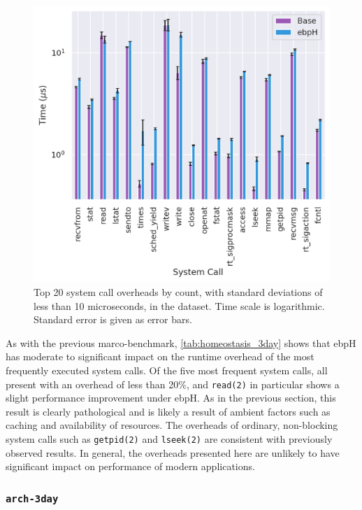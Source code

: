 \documentclass[
  12pt]{findlay}
\newcommand{\passthrough}[1]{#1}
\begin{document}
\begin{figure}
    \caption[Top 20 system call overheads by count in the  dataset]{
        Top 20 system call overheads by count, with standard deviations of less than 10 microseconds,
        in the  dataset. Time scale is logarithmic. Standard error is given as error bars.
    }
    \label{fig:homeostasis_3day}
    \includegraphics[width=.8\textwidth]{../data/bench/homeostasis-3day/homeostasis_3day_times.png}
\end{figure}

As with the previous marco-benchmark, \autoref{tab:homeostasis_3day}
shows that ebpH has moderate to significant impact on the runtime
overhead of the most frequently executed system calls. Of the five most
frequent system calls, all present with an overhead of less than 20\%,
and \passthrough{\lstinline!read(2)!} in particular shows a slight
performance improvement under ebpH. As in the previous section, this
result is clearly pathological and is likely a result of ambient factors
such as caching and availability of resources. The overheads of
ordinary, non-blocking system calls such as
\passthrough{\lstinline!getpid(2)!} and
\passthrough{\lstinline!lseek(2)!} are consistent with previously
observed results. In general, the overheads presented here are unlikely
to have significant impact on performance of modern applications.

\hypertarget{arch-3day}{%
\subsubsection{\texorpdfstring{\texttt{arch-3day}}{arch-3day}}\label{arch-3day}}
\end{document}
